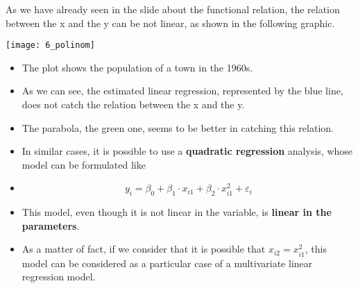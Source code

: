 
\begin{frame}
  As we have already seen in the slide about the functional relation, the relation between the x and the y can be not linear, as shown in the following graphic.
  \begin{center}
    \texttt{[image: 6\_polinom]}
  \end{center}
\end{frame}

\begin{frame}
  \begin{itemize}
    \item The plot shows the population of a town in the 1960s.
    \item As we can see, the estimated linear regression, represented by the blue line, does not catch the relation between the x and the y.
    \item The parabola, the green one, seems to be better in catching this relation.
    \item In similar cases, it is possible to use a \textbf{quadratic regression} analysis, whose model can be formulated like
    \item[] \vspace{-0.6cm} $$ y_i = \beta_0 + \beta_1 \cdot x_{i1} + \beta_2 \cdot x_{i1}^2 + \varepsilon_i $$  \vspace{-0.8cm}
    \item This model, even though it is not linear in the variable, is \textbf{linear in the parameters}.
    \item As a matter of fact, if we consider that it is possible that $ x_{i2} = x_{i1}^2 $, this model can be considered as a particular case of a multivariate linear regression model.
  \end{itemize}
\end{frame}

